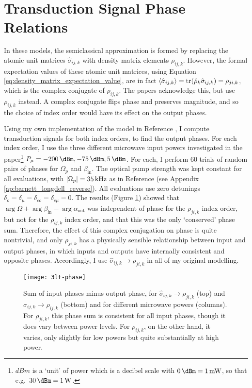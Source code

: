 \section{\label{sec:rho_ji_vs_ij}Transduction Signal Phase Relations}
In these models, the semiclassical approximation is formed by replacing the atomic unit matrices $\hat{\sigma}_{ij,k}$ with density matrix elements $\rho_{ij,k}$. However, the formal expectation values of these atomic unit matrices, using Equation \ref{eq:density_matrix_expectation_value}, are in fact $\left\langle{\hat{\sigma}_{ij,k}}\right\rangle = \operatorname{tr}(\hat{\rho}_k\hat{\sigma}_{ij,k}) = \rho_{ji,k}$, which is the complex conjugate of $\rho_{ij,k}$. The papers acknowledge this, but use $\rho_{ij,k}$ instead. A complex conjugate flips phase and preserves magnitude, and so the choice of index order would have its effect on the output phases.

Using my own implementation of the model in Reference \cite{barnett_longdell_2020}, I compute transduction signals for both index orders, to find the output phases. For each index order, I use the three different microwave input powers investigated in the paper\footnote{$\unit{dBm}$ is a `unit' of power which is a decibel scale with $\qty{0}{\dBm} = \qty{1}{\milli\watt}$, so that e.g.\ $\qty{30}{\dBm} = \qty{1}{\watt}$.} $P_\mu = \qty{-200}{\dBm}, \qty{-75}{\dBm}, \qty{5}{\dBm}$. For each, I perform $60$ trials of random pairs of phases for $\Omega_p$ and $\beta_\text{in}$. The optical pump strength was kept constant for all evaluations, with $\left|\Omega_p\right| = \qty{35}{\kilo\hertz}$ as in Reference \cite{barnett_longdell_2020} (see Appendix \ref{ap:barnett_longdell_reverse}). All evaluations use zero detunings $\delta_o = \delta_\mu = \delta_{co} = \delta_{c\mu} = 0$. The results (Figure \ref{fig:3lt_phase}) showed that $\arg{\Omega} + \arg{\beta_\text{in}} - \arg{\alpha_\text{out}}$ was independent of phase for the $\rho_{ji,k}$ index order, but not for the $\rho_{ij,k}$ index order, and that this was the only `conserved' phase sum. Therefore, the effect of this complex conjugation on phase is quite nontrivial, and only $\rho_{ji,k}$ has a physically sensible relationship between input and output phases, in which inputs and outputs have internally consistent and opposite phases. Accordingly, I use $\hat{\sigma}_{ij,k}\to\rho_{ji,k}$ in all of my original modelling.

\begin{figure}[h]
\centering
\texttt{[image: 3lt-phase]}
\caption{\label{fig:3lt_phase} Sum of input phases minus output phase, for $\hat{\sigma}_{ij,k}\to\rho_{ji,k}$ (top) and $\hat{\sigma}_{ij,k}\to\rho_{ij,k}$ (bottom) and for different microwave powers (columns). For $\rho_{ji,k}$, this phase sum is consistent for all input phases, though it does vary between power levels. For $\rho_{ij,k}$, on the other hand, it varies, only slightly for low powers but quite substantially at high power.}
\end{figure}
